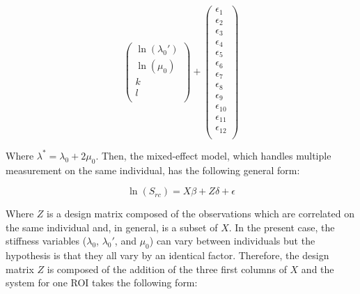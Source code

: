 \documentclass[a4paper,fleqn]{DC_ArtStyle}
\begin{document}
\begin{equation}
\begin{pmatrix}
	\ln(\lambda_0') \\
	\ln(\mu_0) \\
	k \\
	l \\
	\end{pmatrix} + \begin{pmatrix}
	\epsilon_{1} \\
	\epsilon_{2} \\
	\epsilon_{3} \\
	\epsilon_{4} \\
	\epsilon_{5} \\
	\epsilon_{6} \\
	\epsilon_{7} \\
	\epsilon_{8} \\
	\epsilon_{9} \\
	\epsilon_{10} \\
	\epsilon_{11} \\
	\epsilon_{12} \\
	\end{pmatrix}
	\end{equation}
	
	Where $\lambda^{*} = \lambda_0 + 2\mu_0$. Then, the mixed-effect model, which handles multiple measurement on the same individual, has the following general form:
	
	\begin{equation}
	\ln(S_{rc}) = X \beta + Z \delta + \epsilon
	\end{equation}
	
	Where $Z$ is a design matrix composed of the observations which are correlated on the same individual and, in general, is a subset of $X$. In the present case, the stiffness variables ($\lambda_0$, $\lambda_0'$, and $\mu_0$) can vary between individuals but the hypothesis is that they all vary by an identical factor. Therefore, the design matrix $Z$ is composed of the addition of the three first columns of $X$ and the system for one ROI takes the following form:\\
	
\end{document}
